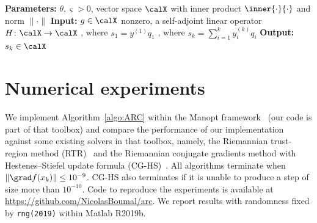 \begin{algorithm}[t]
	\caption{Lanczos-based cubic model subsolver}
	\label{algo:lanczosoptimized}
	\begin{algorithmic}[1]
		\State \textbf{Parameters:} $\theta , \varsigma > 0$, vector space $\calX$ with inner product $\inner{\cdot}{\cdot}$ and norm $\|\cdot\|$
		\State \textbf{Input:} $g \in \calX$ nonzero, a self-adjoint linear operator $H\colon\calX \rightarrow \calX$
		\Statex 
		, where $s_1 = y^{(1)} q_1$
		\Statex
		, where $s_k = \sum_{i = 1}^k y^{(k)}_i q_i^{}$
		\EndWhile
		\Statex
		\State \textbf{Output:} $s_k \in \calX$
	\end{algorithmic}
	
\end{algorithm}



\section{Numerical experiments} \label{sec:XP}


We implement Algorithm~\ref{algo:ARC} within the Manopt framework~\citep{manopt} (our code is part of that toolbox) and compare the performance of our implementation against some existing solvers in that toolbox, namely, the Riemannian trust-region method (RTR)~\citep{genrtr} and the Riemannian conjugate gradients method with Hestenes--Stiefel update formula (CG-HS)~\citep[\S8.3]{AMS08}. All algorithms terminate when $\|\grad f(x_k)\| \leq 10^{-9}$. CG-HS also terminates if it is unable to produce a step of size more than $10^{-10}$. Code to reproduce the experiments is available at \url{https://github.com/NicolasBoumal/arc}. We report results with randomness fixed by \texttt{rng(2019)} within Matlab R2019b.

